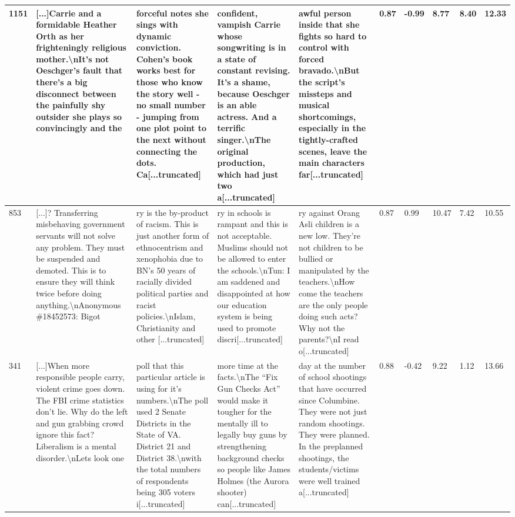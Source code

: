 \documentclass{article}
\theoremstyle{plain}
\theoremstyle{definition}
\theoremstyle{remark}
\begin{document}
\begin{table}[ht]
\begin{tabular}{p{0.2cm}|p{2.75cm}|p{2.75cm}|p{2.75cm}|p{2.75cm}|p{0.2cm}|p{0.42cm}|p{0.42cm}|p{0.3cm}|p{0.3cm}}
1151 & [...]Carrie and a formidable Heather Orth as her frighteningly religious mother.\textbackslash nIt's not Oeschger's fault that there's a big disconnect between the painfully shy outsider she plays so convincingly and the &    forceful notes she sings with dynamic conviction. Cohen's book works best for those who know the story well - no small number - jumping from one plot point to the next without connecting the dots. Ca[...truncated] &  confident, vampish Carrie whose songwriting is in a state of constant revising. It's a shame, because Oeschger is an able actress. And a terrific singer.\textbackslash nThe original production, which had just two a[...truncated] &   awful person inside that she fights so hard to control with forced bravado.\textbackslash nBut the script's missteps and musical shortcomings, especially in the tightly-crafted scenes, leave the main characters far[...truncated] &               0.87 &          -0.99 &          8.77 &       8.40 &     12.33 \\\midrule
 853 & [...]? Transferring misbehaving government servants will not solve any problem. They must be suspended and demoted. This is to ensure they will think twice before doing anything.\textbackslash nAnonymous \#18452573: Bigot &  ry is the by-product of racism. This is just another form of ethnocentrism and xenophobia due to BN's 50 years of racially divided political parties and racist policies.\textbackslash nIslam, Christianity and other [...truncated] & ry in schools is rampant and this is not acceptable. Muslims should not be allowed to enter the schools.\textbackslash nTun: I am saddened and disappointed at how our education system is being used to promote discri[...truncated] & ry against Orang Asli children is a new low. They're not children to be bullied or manipulated by the teachers.\textbackslash nHow come the teachers are the only people doing such acts? Why not the parents?\textbackslash nI read o[...truncated] &               0.87 &           0.99 &         10.47 &       7.42 &     10.55 \\\midrule
 341 & [...]When more responsible people carry, violent crime goes down. The FBI crime statistics don’t lie. Why do the left and gun grabbing crowd ignore this fact? Liberalism is a mental disorder.\textbackslash nLets look one &  poll that this particular article is using for it’s numbers.\textbackslash nThe poll used 2 Senate Districts in the State of VA. District 21 and District 38.\textbackslash nwith the total numbers of respondents being 305 voters i[...truncated] &  more time at the facts.\textbackslash nThe “Fix Gun Checks Act” would make it tougher for the mentally ill to legally buy guns by strengthening background checks so people like James Holmes (the Aurora shooter) can[...truncated] &    day at the number of school shootings that have occurred since Columbine. They were not just random shootings. They were planned. In the preplanned shootings, the students/victims were well trained a[...truncated] &               0.88 &          -0.42 &          9.22 &       1.12 &     13.66 \\

\end{tabular}
\end{table}
\end{document}
